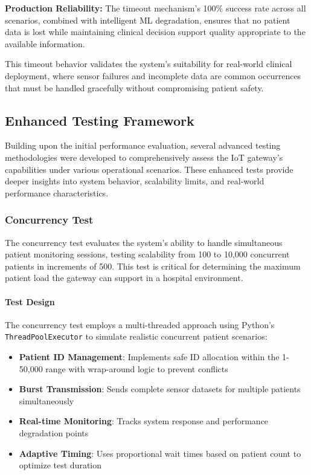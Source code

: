 \textbf{Production Reliability:} The timeout mechanism's 100\% success rate across all scenarios, combined with intelligent ML degradation, ensures that no patient data is lost while maintaining clinical decision support quality appropriate to the available information.

This timeout behavior validates the system's suitability for real-world clinical deployment, where sensor failures and incomplete data are common occurrences that must be handled gracefully without compromising patient safety.

\subsection{Enhanced Testing Framework}

Building upon the initial performance evaluation, several advanced testing methodologies were developed to comprehensively assess the IoT gateway's capabilities under various operational scenarios. These enhanced tests provide deeper insights into system behavior, scalability limits, and real-world performance characteristics.

\subsubsection{Concurrency Test}

The concurrency test evaluates the system's ability to handle simultaneous patient monitoring sessions, testing scalability from 100 to 10,000 concurrent patients in increments of 500. This test is critical for determining the maximum patient load the gateway can support in a hospital environment.

\paragraph{Test Design}
The concurrency test employs a multi-threaded approach using Python's \texttt{ThreadPoolExecutor} to simulate realistic concurrent patient scenarios:

\begin{itemize}
    \item \textbf{Patient ID Management}: Implements safe ID allocation within the 1-50,000 range with wrap-around logic to prevent conflicts
    \item \textbf{Burst Transmission}: Sends complete sensor datasets for multiple patients simultaneously
    \item \textbf{Real-time Monitoring}: Tracks system response and performance degradation points
    \item \textbf{Adaptive Timing}: Uses proportional wait times based on patient count to optimize test duration
\end{itemize}

